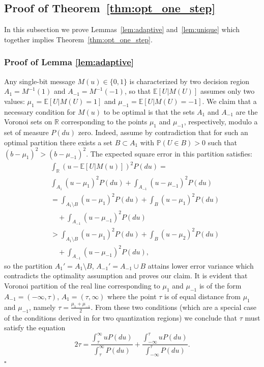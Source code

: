 \documentclass[letterpaper, conference, 11pt]{IEEEtran}      %
\newcommand*{\QEDA}{\hfill\ensuremath{\square}}
\begin{document}
\subsection*{Proof of Theorem~\ref{thm:opt_one_step}}
In this subsection we prove Lemmas~\ref{lem:adaptive} and~\ref{lem:unique} which together implies Theorem~\ref{thm:opt_one_step}. 

\subsubsection*{Proof of Lemma \ref{lem:adaptive}}
Any single-bit message $M(u) \in \{0,1\}$ is characterized by two decision region $A_1 = M^{-1}(1)$ and $A_{-1} = M^{-1}(-1)$, so that $\mathbb E \left[ U | M(U) \right]$ assumes only two values: $\mu_1 = \mathbb E \left[ U | M(U) = 1 \right]$ and $\mu_{-1} = \mathbb E \left[ U | M(U) = -1 \right]$. We claim that a necessary condition for $M(u)$ to be optimal is that the sets $A_1$ and $A_{-1}$ are the Voronoi sets on $\mathbb R$ corresponding to the points $\mu_1$ and $\mu_{-1}$, respectively, modulo a set of measure $P(du)$ zero. Indeed, assume by contradiction that for such an optimal partition there exists a set $B \subset A_{1}$ with $\mathbb P (U \in B) >0$ such that $\left( b-\mu_{1} \right)^2 > \left( b- \mu_{-1} \right)^2$. The expected square error in this partition satisfies:
\begin{align*}
& \int_{\mathbb R} \left( u - \mathbb E[U|M(u)]  \right)^2 P(du) =  \\
& \int_{A_1} (u- \mu_1)^2 P(du) + \int_{A_{-1}} (u- \mu_{-1})^2 P(du) \\
& = \int_{A_1\setminus B} (u- \mu_1)^2 P(du) +  \int_{B} (u- \mu_1)^2 P(du) \\
& \quad + \int_{A_{-1}} (u- \mu_{-1})^2 P(du) \\
& > \int_{A_1\setminus B} (u- \mu_1)^2 P(du) +  \int_{B} (u- \mu_2)^2 P(du) \\
& \quad + \int_{A_{-1}} (u- \mu_{-1})^2 P(du),
\end{align*}
so the partition $A_1' = A_1 \setminus B$, $A_{-1}' = A_{-1} \cup B$ attains lower error variance which contradicts the optimality assumption and proves our claim. It is evident that Voronoi partition of the real line corresponding to $\mu_1$ and $\mu_{-1}$ is of the form $A_{-1} = (-\infty,\tau)$, $A_{1} = (\tau, \infty)$ where the point $\tau$ is of equal distance from $\mu_1$ and $\mu_{-1}$, namely $\tau = \frac{\mu_1 + \mu_{-1}}{2}$. From these two conditions (which are a special case of the conditions derived in \cite{1056489} for two quantization regions) we conclude that $\tau$ must satisfy the equation
\[
2 \tau = \frac{\int_{\tau}^\infty u P(du)}{\int_{\tau}^\infty P(du)} + \frac{\int_{-\infty}^{\tau} u P(du)}{\int_{-\infty}^{\tau} P(du)}.
\] 
\QEDA
\end{document}
